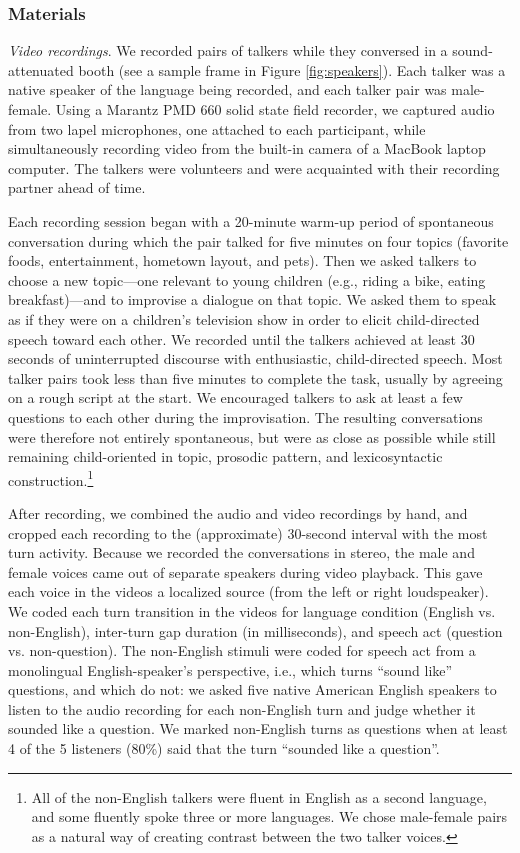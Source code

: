 \documentclass[authoryear, 12pt]{elsarticle}
\begin{document}
\subsubsection{Materials}

\textit{Video recordings}. We recorded pairs of talkers while they conversed in a sound-attenuated booth (see a sample frame in Figure \ref{fig:speakers}). Each talker was a native speaker of the language being recorded, and each talker pair was male-female. Using a Marantz PMD 660 solid state field recorder, we captured audio from two lapel microphones, one attached to each participant, while simultaneously recording video from the built-in camera of a MacBook laptop computer. The talkers were volunteers and were acquainted with their recording partner ahead of time. 

Each recording session began with a 20-minute warm-up period of spontaneous conversation during which the pair talked for five minutes on four topics (favorite foods, entertainment, hometown layout, and pets). Then we asked talkers to choose a new topic---one relevant to young children (e.g., riding a bike, eating breakfast)---and to improvise a dialogue on that topic. We asked them to speak as if they were on a children's television show in order to elicit child-directed speech toward each other. We recorded until the talkers achieved at least 30 seconds of uninterrupted discourse with enthusiastic, child-directed speech. Most talker pairs took less than five minutes to complete the task, usually by agreeing on a rough script at the start. We encouraged talkers to ask at least a few questions to each other during the improvisation. The resulting conversations were therefore not entirely spontaneous, but were as close as possible while still remaining child-oriented in topic, prosodic pattern, and lexicosyntactic construction.\footnote{All of the non-English talkers were fluent in English as a second language, and some fluently spoke three or more languages. We chose male-female pairs as a natural way of creating contrast between the two talker voices.}

After recording, we combined the audio and video recordings by hand, and cropped each recording to the (approximate) 30-second interval with the most turn activity. Because we recorded the conversations in stereo, the male and female voices came out of separate speakers during video playback. This gave each voice in the videos a localized source (from the left or right loudspeaker). We coded each turn transition in the videos for language condition (English vs. non-English), inter-turn gap duration (in milliseconds), and speech act (question vs. non-question). The non-English stimuli were coded for speech act from a monolingual English-speaker's perspective, i.e., which turns ``sound like'' questions, and which do not: we asked five native American English speakers to listen to the audio recording for each non-English turn and judge whether it sounded like a question. We marked non-English turns as questions when at least 4 of the 5 listeners (80\%) said that the turn ``sounded like a question''.
\end{document}
